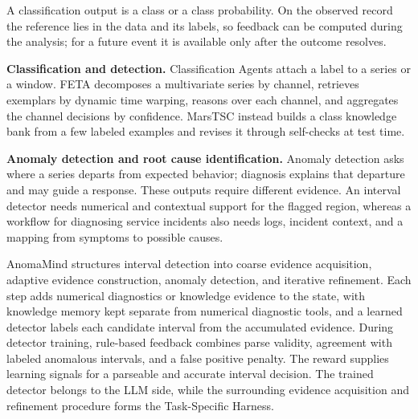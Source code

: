 \documentclass[preprints,article,submit,moreauthors]{Definitions/mdpi}
\begin{document}
A classification output is a class or a class probability. On the observed record the reference lies in the data and its labels, so feedback can be computed during the analysis; for a future event it is available only after the outcome resolves.

\noindent\textbf{Classification and detection.} Classification Agents attach a label to a series or a window. FETA \citep{feta2025} decomposes a multivariate series by channel, retrieves exemplars by dynamic time warping, reasons over each channel, and aggregates the channel decisions by confidence. MarsTSC \citep{marstsc2026} instead builds a class knowledge bank from a few labeled examples and revises it through self-checks at test time.

\noindent\textbf{Anomaly detection and root cause identification.} Anomaly detection asks where a series departs from expected behavior; diagnosis explains that departure and may guide a response. These outputs require different evidence. An interval detector needs numerical and contextual support for the flagged region, whereas a workflow for diagnosing service incidents also needs logs, incident context, and a mapping from symptoms to possible causes.

AnomaMind \citep{anomamind2026} structures interval detection into coarse evidence acquisition, adaptive evidence construction, anomaly detection, and iterative refinement. Each step adds numerical diagnostics or knowledge evidence to the state, with knowledge memory kept separate from numerical diagnostic tools, and a learned detector labels each candidate interval from the accumulated evidence. During detector training, rule-based feedback combines parse validity, agreement with labeled anomalous intervals, and a false positive penalty.
The reward supplies learning signals for a parseable and accurate interval decision. The trained detector belongs to the LLM side, while the surrounding evidence acquisition and refinement procedure forms the Task-Specific Harness.

\end{document}
